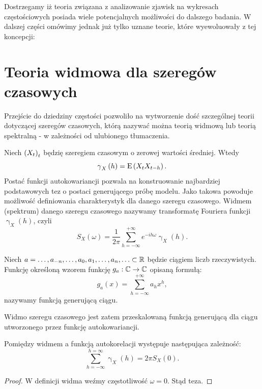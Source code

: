 \documentclass[10pt,a4paper]{book}
\newcommand{\tsAutoCovariance}[3][\gamma]{\operatorname{#1}_{#2} \left({#3}\right)}
\begin{document}
Dostrzegamy iż teoria związana z analizowanie zjawisk na wykresach częstościowych posiada wiele potencjalnych możliwości do dalszego badania. W dalszej części omówimy jednak już tylko uznane teorie, które wyewoluowały z tej koncepcji:

\section{Teoria widmowa dla szeregów czasowych}

Przejście do dziedziny częstości pozwoliło na wytworzenie dość szczególnej teorii dotyczącej szeregów czasowych, którą nazywać można teorią widmową lub teorią spektralną - w zależności od ulubionego tłumaczenia.

\begin{definition}
Niech $\left({X_t}\right)_{t}$ będzię szeregiem czasowym o zerowej wartości średniej. Wtedy
$$
\tsAutoCovariance{X}{h} = \Ex{X_t X_{t-h}}.
$$
Postać funkcji autokowariancji pozwala na konstruowanie najbardziej podstawowych tez o postaci generującego próbę modelu. Jako takowa powoduje możliwość definiowania charakterystyk dla danego szeregu czasowego. Widmem (spektrum) danego szeregu czasowego nazywamy transformatę Fouriera funkcji $\tsAutoCovariance{X}{h}$, czyli
$$
S_X(\omega) = \frac{1}{2\pi} \sum_{h=-\infty}^{+\infty} e^{-ih\omega} \tsAutoCovariance{X}{h}.
$$
\end{definition}

\begin{definition}
Niech $a = \ldots, a_{-n}, \ldots, a_0, a_1, \ldots, a_n, \ldots \subset \mathbb{R} $ będzie ciągiem liczb rzeczywistych. Funkcję określoną wzorem funkcję $g_a : \mathbb{C} \to \mathbb{C}$ opisaną formułą:
$$
g_a(x) = \sum_{h= -\infty}^{+\infty} a_h x^{h},
$$
nazywamy funkcją generującą ciągu.
\end{definition}

\begin{remark*}
Widmo szeregu czasowego jest zatem przeskalowaną funkcją generującą dla ciągu utworzonego przez funkcję autokowariancji. 
\end{remark*}

\begin{corollary}[]
Pomiędzy widmem a funkcją autokorelacji występuje następująca zależność:
$$
\sum_{h=-\infty}^{h=\infty} \tsAutoCovariance{X}{h} = 2\pi S_X(0).
$$
\end{corollary}

\begin{proof}
W definicji widma weźmy częstotliwość $\omega = 0$. Stąd teza.
\end{proof}
\end{document}
